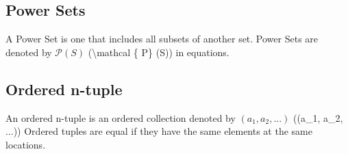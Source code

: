 \documentclass{article}
\begin{document}
        \subsection{Power Sets}
            A Power Set is one that includes all subsets of another set.
            Power Sets are denoted by $\mathcal{P}(S)$ (\textbackslash mathcal \{ P\} (S)) in equations.
        \subsection{Ordered n-tuple}
            An ordered n-tuple is an ordered collection denoted by $(a_1, a_2, ...)$ ((a\_1, a\_2, ...))
            Ordered tuples are equal if they have the same elements at the same locations.
\end{document}
